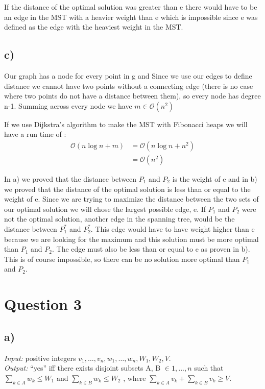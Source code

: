 \documentclass[12pt]{article}
\begin{document}
If the distance of the optimal solution was greater than e there would have to be an edge in the MST with a heavier weight than e which is impossible since e was defined as the edge with the heaviest weight in the MST.

\subsection*{c)}
Our graph has a node for every point in g and Since we use our edges to define distance we cannot have two points without a connecting edge (there is no case where two points do not have a distance between them), so every node has degree n-1. Summing across every node we have $m \in \mathcal{O}(n^2)$

If we use Dijkstra's algorithm to make the MST with Fibonacci heaps we will have a run time of :
\begin{align*}
    \mathcal{O}(n\log n + m) &= \mathcal{O}(n\log n + n^2)\\
                            &=\mathcal{O}(n^2)
\end{align*}

In a) we proved that the distance between $P_1$ and $P_2$ is the weight of e and in b) we proved that the distance of the optimal solution is less than or equal to the weight of e. Since we are trying to maximize the distance between the two sets of our optimal solution we will chose the largest possible edge, e. If $P_1$ and $P_2$ were not the optimal solution, another edge in the spanning tree, would be the distance between $P_1^*$ and $P_2^*$. This edge would have to have weight higher than e because we are looking for the maximum and this solution must be more optimal than $P_1$ and $P_2$. The edge must also be less than or equal to e as proven in b). This is of course impossible, so there can be no solution more optimal than $P_1$ and $P_2$.


\section*{Question 3}
\subsection*{a)}
\textit{Input: }positive integers $v_1, \dots , v_n, w_1, \dots, w_n, W_1, W_2, V.$ \\
\textit{Output: } ``yes'' iff there exists disjoint subsets A, B $\in {1, . . . , n}$ such that $\sum_{k \in A}w_k \leq W_1$ and $\sum_{k \in B}w_k \leq W_2$ , where $\sum_{k \in A}v_k + \sum_{k \in B}v_k \geq V$.
\end{document}
